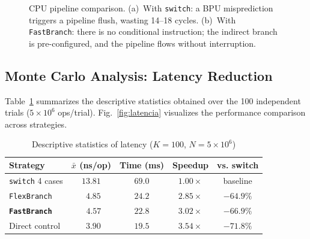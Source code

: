 \begin{figure}[t]
{
}
\caption{CPU pipeline comparison. (a)~With \texttt{switch}: a BPU misprediction triggers a pipeline flush, wasting 14--18 cycles. (b)~With \texttt{FastBranch}: there is no conditional instruction; the indirect branch is pre-configured, and the pipeline flows without interruption.}
\label{fig:pipeline}
\end{figure}
\endgroup
\addtocounter{figure}{-1}

\subsection{Monte Carlo Analysis: Latency Reduction}
Table~\ref{tab:montecarlo} summarizes the descriptive statistics obtained over the 100 independent trials ($5\times10^6$ ops/trial). Fig.~\ref{fig:latencia} visualizes the performance comparison across strategies.

\begin{table}[ht]
\centering
\caption{Descriptive statistics of latency ($K=100$, $N=5\times10^6$)}
\label{tab:montecarlo}
\begin{tabular}{@{}lcccc@{}}
\toprule
\textbf{Strategy} & \textbf{$\bar{x}$ (ns/op)} & \textbf{Time (ms)} & \textbf{Speedup} & \textbf{vs. switch} \\ \midrule
\texttt{switch} 4 cases     & $13.81$ & $69.0$ & $1.00\times$ & baseline \\
\texttt{FlexBranch}         & $\phantom{0}4.85$ & $24.2$ & $2.85\times$ & $-64.9\%$ \\
\textbf{\texttt{FastBranch}} & $\mathbf{\phantom{0}4.57}$ & $\mathbf{22.8}$ & $\mathbf{3.02\times}$ & $\mathbf{-66.9\%}$ \\
Direct control              & $\phantom{0}3.90$ & $19.5$ & $3.54\times$ & $-71.8\%$ \\ \bottomrule
\end{tabular}
\end{table}

